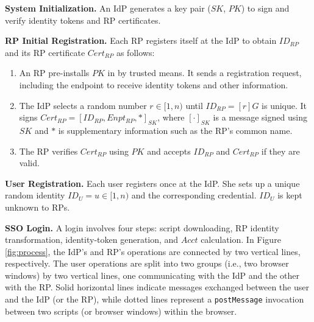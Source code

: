 \noindent \textbf{System Initialization.}
An IdP generates a key pair ($SK$, $PK$) to sign and verify identity tokens and RP certificates.

\vspace{0.75mm}
\noindent\textbf{RP Initial Registration.}
Each RP registers itself at the IdP to obtain $ID_{RP}$ and its RP certificate $Cert_{RP}$ as follows:
\vspace{-\topsep}\begin{enumerate}
\setlength{\topsep}{0pt}
\setlength{\partopsep}{0pt}
\setlength{\itemsep}{0pt}
\setlength{\parsep}{0pt}
\setlength{\parskip}{0pt}
\item
An RP pre-installs $PK$ in by trusted means.
It sends a registration request, including the endpoint to receive identity tokens and other information.
\item
The IdP selects a random number $r \in [1,n)$ until $ID_{RP} = [r]G$ is unique.
It signs $Cert_{RP} = [ID_{RP}, Enpt_{RP}, *]_{SK}$,
     where $[\cdot]_{SK}$ is a message signed using $SK$ and $*$ is supplementary information such as the RP's common name.
\item
The RP verifies $Cert_{RP}$ using $PK$ and accepts $ID_{RP}$ and $Cert_{RP}$ if they are valid.
\end{enumerate}


\noindent\textbf{User Registration.}
Each user registers once at the IdP. She sets up a unique random identity $ID_U = u \in [1, n)$ and the corresponding credential. $ID_U$ is kept unknown to RPs.


\vspace{0.75mm}
\noindent\textbf{SSO Login.} A login %
involves four steps: script downloading, RP identity transformation, identity-token generation, and $Acct$ calculation. In Figure \ref{fig:process}, the IdP's and RP's operations are connected by two vertical lines, respectively. The user operations are split into two groups (i.e., two browser windows) by two vertical lines, one communicating with the IdP and the other with the RP. Solid horizontal lines indicate messages exchanged between the user and the IdP (or the RP), while dotted lines represent a \verb+postMessage+ invocation between two scripts (or browser windows) within the browser.


